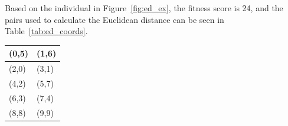 \documentclass[12pt]{article} %
\begin{document}
Based on the individual in Figure~\ref{fig:ed_ex}, the fitness score is 24, and the pairs used to calculate the Euclidean distance can be seen in Table~\ref{tab:ed_coords}.
\begin{center}
 \label{tab:ed_coords} 
    \begin{tabular}{|l|l|}
        \hline
        (0,5) & (1,6) \\ \hline
        (2,0) & (3,1) \\ \hline
        (4,2) & (5,7) \\ \hline
        (6,3) & (7,4) \\ \hline
        (8,8) & (9,9) \\ \hline
    \end{tabular}
\end{center}
%
%
\end{document}
